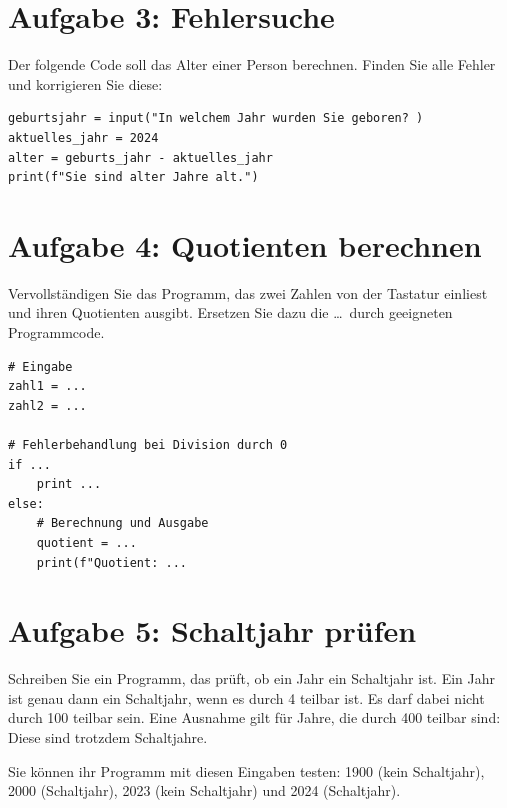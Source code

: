 \documentclass[ngerman,11pt]{article}
\begin{document}
\section*{Aufgabe 3: Fehlersuche}

Der folgende Code soll das Alter einer Person berechnen. Finden Sie alle Fehler und korrigieren Sie diese:

\begin{lstlisting}
geburtsjahr = input("In welchem Jahr wurden Sie geboren? )
aktuelles_jahr = 2024
alter = geburts_jahr - aktuelles_jahr
print(f"Sie sind alter Jahre alt.")
\end{lstlisting}

\section*{Aufgabe 4: Quotienten berechnen}
Vervollständigen Sie das Programm, das zwei Zahlen von der Tastatur einliest und ihren Quotienten ausgibt. Ersetzen Sie dazu die \ldots~durch geeigneten Programmcode.

\begin{lstlisting}
# Eingabe
zahl1 = ...
zahl2 = ...

# Fehlerbehandlung bei Division durch 0
if ...
	print ...
else:
	# Berechnung und Ausgabe
	quotient = ...
	print(f"Quotient: ...
\end{lstlisting}

\section*{Aufgabe 5: Schaltjahr prüfen}
Schreiben Sie ein Programm, das prüft, ob ein Jahr ein Schaltjahr ist. Ein Jahr ist genau dann ein Schaltjahr, wenn es durch 4 teilbar ist. Es darf dabei nicht durch 100 teilbar sein. Eine Ausnahme gilt für Jahre, die durch 400 teilbar sind: Diese sind trotzdem Schaltjahre.

Sie können ihr Programm mit diesen Eingaben testen: 1900 (kein Schaltjahr), 2000 (Schaltjahr), 2023 (kein Schaltjahr) und 2024 (Schaltjahr).
\end{document}
